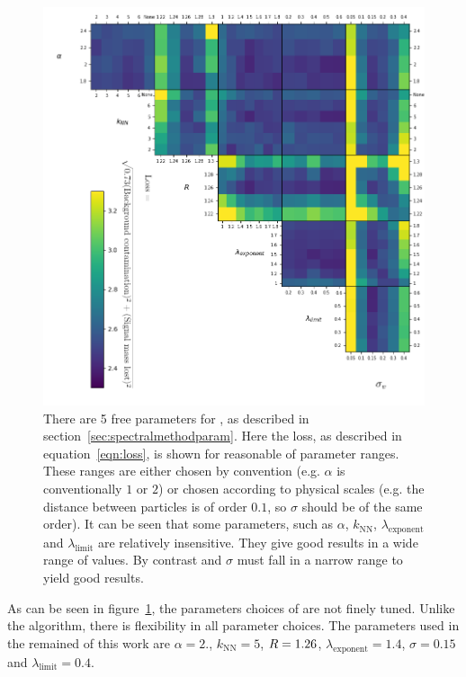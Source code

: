     \begin{figure}[htp]
            \includegraphics[width=1\textwidth]{graphics/trangle_scan_incomplete2.png}
            \caption{There are 5 free parameters for \spectral{},
                as described in section~\ref{sec:spectralmethodparam}.
                Here the loss, as described in equation~\ref{eqn:loss}, is shown for reasonable of parameter ranges.
                These ranges are either chosen by convention (e.g. \(\alpha\) is conventionally \(1\) or \(2\))
                or chosen according to physical scales (e.g. the distance between particles is of order \(0.1\),
                so \(\sigma\) should be of the same order).
                It can be seen that some parameters, such as \(\alpha\), \(k_\text{NN}\), \(\lambda_\text{exponent}\)
                and \(\lambda_\text{limit}\) are relatively insensitive.
                They give good results in a wide range of values.
                By contrast \stoppingdeltar{} and \(\sigma\) must fall in a narrow range to yield good results.
             }\label{fig:scan_spectral}
    \end{figure}    

    As can be seen in figure~\ref{fig:scan_spectral}, the parameters choices of \spectral{} are not finely tuned.
    Unlike the \antikt{} algorithm, there is flexibility in all parameter choices.
    The parameters used in the remained of this work are \(\alpha=2.\), \(k_\text{NN}=5\), \(R{} = 1.26\), \(\lambda_\text{exponent} = 1.4\), \(\sigma = 0.15\) and \(\lambda_\text{limit} = 0.4\).
